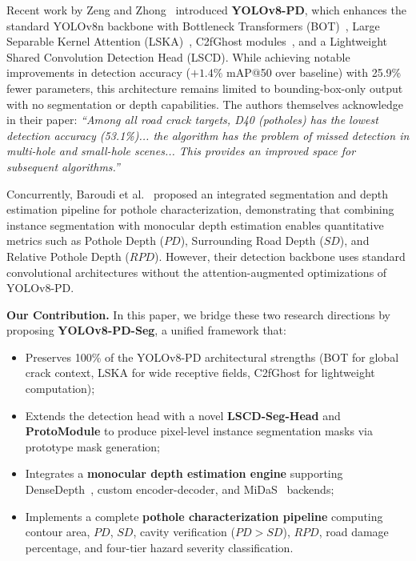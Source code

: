 \documentclass[conference]{IEEEtran}
\begin{document}
Recent work by Zeng and Zhong~\cite{zeng2024yolov8pd} introduced \textbf{YOLOv8-PD}, which enhances the standard YOLOv8n backbone with Bottleneck Transformers (BOT)~\cite{srinivas2021botnet}, Large Separable Kernel Attention (LSKA)~\cite{li2023lska}, C2fGhost modules~\cite{han2020ghostnet}, and a Lightweight Shared Convolution Detection Head (LSCD). While achieving notable improvements in detection accuracy ($+1.4\%$ mAP@50 over baseline) with 25.9\% fewer parameters, this architecture remains limited to bounding-box-only output with no segmentation or depth capabilities. The authors themselves acknowledge in their paper: \textit{``Among all road crack targets, D40 (potholes) has the lowest detection accuracy (53.1\%)... the algorithm has the problem of missed detection in multi-hole and small-hole scenes... This provides an improved space for subsequent algorithms.''}

Concurrently, Baroudi et al.~\cite{baroudi2025pothole} proposed an integrated segmentation and depth estimation pipeline for pothole characterization, demonstrating that combining instance segmentation with monocular depth estimation enables quantitative metrics such as Pothole Depth ($PD$), Surrounding Road Depth ($SD$), and Relative Pothole Depth ($RPD$). However, their detection backbone uses standard convolutional architectures without the attention-augmented optimizations of YOLOv8-PD.

\textbf{Our Contribution.} In this paper, we bridge these two research directions by proposing \textbf{YOLOv8-PD-Seg}, a unified framework that:
\begin{itemize}[leftmargin=*]
    \item Preserves 100\% of the YOLOv8-PD architectural strengths (BOT for global crack context, LSKA for wide receptive fields, C2fGhost for lightweight computation);
    \item Extends the detection head with a novel \textbf{LSCD-Seg-Head} and \textbf{ProtoModule} to produce pixel-level instance segmentation masks via prototype mask generation;
    \item Integrates a \textbf{monocular depth estimation engine} supporting DenseDepth~\cite{alhashim2018densedepth}, custom encoder-decoder, and MiDaS~\cite{ranftl2020midas} backends;
    \item Implements a complete \textbf{pothole characterization pipeline} computing contour area, $PD$, $SD$, cavity verification ($PD > SD$), $RPD$, road damage percentage, and four-tier hazard severity classification.
\end{itemize}
\end{document}
